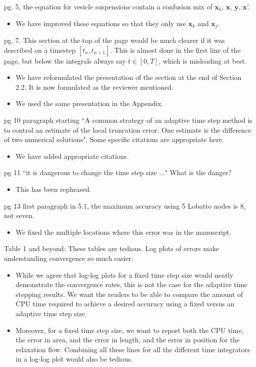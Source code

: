 \documentclass[12pt]{article}
\newcommand{\comment}[1]{{\color{blue} #1}}
\newcommand{\xx}{{\mathbf{x}}}
\newcommand{\yy}{{\mathbf{y}}}
\begin{document}
\comment{ pg. 5, the equation for vesicle suspensions contain a
confusion mix of $\xx_{k}$, $\xx$, $\yy$, $\xx$'.}
\begin{itemize}
  \item We have improved these equations so that they only use $\xx_{k}$
  and $\xx_{j}$.
\end{itemize}

\comment{pg. 7. This section at the top of the page would be much
clearer if it was described on a timestep $[t_{n}, t_{n+1}]$. This is almost
done in the first line of the page, but below the integrals always say 
$t \in [0, T]$, which is misleading at best.}
\begin{itemize}
  \item We have reformulated the presentation of the section at the end
  of Section 2.2.  It is now formulated as the reviewer mentioned.
  \item We used the same presentation in the Appendix.
\end{itemize}

\comment{pg 10 paragraph starting ``A common strategy of an adaptive
time step method is to control an estimate of the local truncation
error. One estimate is the difference of two numerical solutions".  Some
specific citations are appropriate here.}
\begin{itemize}
  \item We have added appropriate citations.
\end{itemize}

\comment{pg 11 ``it is dangerous to change the time step size ..." What
is the danger?}
\begin{itemize}
  \item This has been rephrased.
\end{itemize}

\comment{pg 13 first paragraph in 5.1, the maximum accuracy using 5
Lobatto nodes is 8, not seven.}
\begin{itemize}
  \item We fixed the multiple locations where this error was in the
  manuscript.
\end{itemize}

\comment{Table 1 and beyond: These tables are tedious. Log plots of
errors make understanding convergence so much easier.}
\begin{itemize}
  \item While we agree that log-log plots for a fixed time step size
  would neatly demonstrate the convergence rates, this is not
  the case for the adaptive time stepping results.  We want the readers
  to be able to compare the amount of CPU time required to achieve a
  desired accuracy using a fixed versus an adaptive time step size.

  \item Moreover, for a fixed time step size, we want to report both the
  CPU time, the error in area, and the error in length, and the error in
  position for the relaxation flow.  Combining all these lines for all
  the different time integrators in a log-log plot would also be
  tedious.
\end{itemize}
\end{document}
